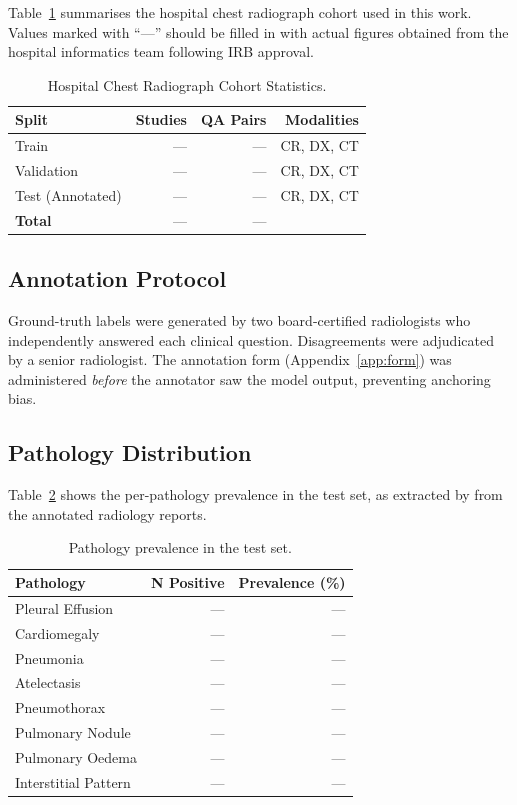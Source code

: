 Table~\ref{tab:cohort} summarises the hospital chest radiograph cohort
used in this work. Values marked with ``---'' should be filled in with
actual figures obtained from the hospital informatics team following
IRB approval.

\begin{table}[htbp]
\centering
\caption{Hospital Chest Radiograph Cohort Statistics.}
\label{tab:cohort}
\begin{tabular}{@{}lrrr@{}}
\toprule
\textbf{Split} & \textbf{Studies} & \textbf{QA Pairs} & \textbf{Modalities} \\
\midrule
Train           & ---  & ---  & CR, DX, CT \\
Validation      & ---  & ---  & CR, DX, CT \\
Test (Annotated)& ---  & ---  & CR, DX, CT \\
\midrule
\textbf{Total}  & ---  & ---  & \\
\bottomrule
\end{tabular}
\end{table}

\subsection{Annotation Protocol}
\label{subsec:annotation}

Ground-truth labels were generated by two board-certified radiologists who
independently answered each clinical question. Disagreements were adjudicated
by a senior radiologist. The annotation form (Appendix~\ref{app:form}) was
administered \emph{before} the annotator saw the model output, preventing
anchoring bias.

\subsection{Pathology Distribution}
\label{subsec:distribution}

Table~\ref{tab:findings} shows the per-pathology prevalence in the test set,
as extracted by  from the annotated radiology reports.

\begin{table}[htbp]
\centering
\caption{Pathology prevalence in the test set.}
\label{tab:findings}
\begin{tabular}{@{}lrr@{}}
\toprule
\textbf{Pathology} & \textbf{N Positive} & \textbf{Prevalence (\%)} \\
\midrule
Pleural Effusion    & --- & --- \\
Cardiomegaly        & --- & --- \\
Pneumonia           & --- & --- \\
Atelectasis         & --- & --- \\
Pneumothorax        & --- & --- \\
Pulmonary Nodule    & --- & --- \\
Pulmonary Oedema    & --- & --- \\
Interstitial Pattern& --- & --- \\
\bottomrule
\end{tabular}
\end{table}

